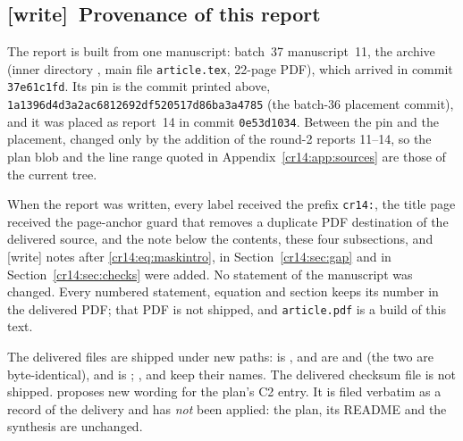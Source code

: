 \documentclass[11pt,a4paper]{article}
\theoremstyle{definition}
\theoremstyle{remark}
\newcommand{\wtag}{\textup{[write]}}
\begin{document}
\subsection{\wtag\ Provenance of this report}
\label{cr14:sec:wprov}
The report is built from one manuscript: batch~37 manuscript~11, the
archive  (inner directory
, main file \texttt{article.tex}, 22-page
PDF), which arrived in commit \texttt{37e61c1fd}. Its pin is the commit
printed above, \texttt{1a1396d4d3a2ac6812692df520517d86ba3a4785} (the
batch-36 placement commit), and it was placed as report~14 in commit
\texttt{0e53d1034}. Between the pin and the placement,
 changed only by the addition of the
round-2 reports 11--14, so the plan blob and the line range quoted in
Appendix~\ref{cr14:app:sources} are those of the current tree.

When the report was written, every label received the prefix
\texttt{cr14:}, the title page received the page-anchor guard that removes
a duplicate PDF destination of the delivered source, and the note below the
contents, these four subsections, and \wtag{} notes after
\eqref{cr14:eq:maskintro}, in Section~\ref{cr14:sec:gap} and in
Section~\ref{cr14:sec:checks} were added. No statement of the manuscript
was changed. Every numbered statement, equation and section keeps its
number in the delivered PDF; that PDF is not shipped, and
\texttt{article.pdf} is a build of this text.

The delivered files are shipped under new paths:
 is ,
 and  are
 and  (the two are
byte-identical), and  is ;
,  and 
keep their names. The delivered checksum file is not shipped.
 proposes new wording for the plan's C2 entry.
It is filed verbatim as a record of the delivery and has \emph{not} been
applied: the plan, its README and the synthesis are unchanged.
\end{document}
